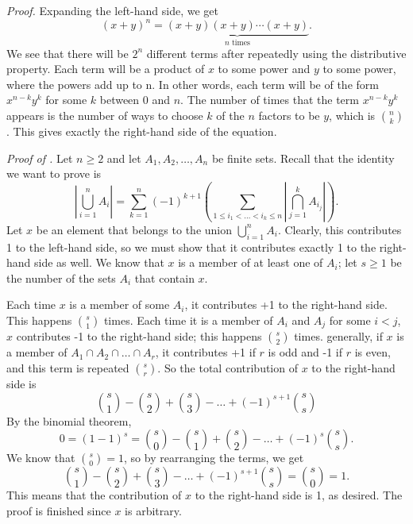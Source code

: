 \documentclass{tufte-handout}
\begin{document}
\textit{Proof.} Expanding the left-hand side, we get
\[(x+y)^n = \underbrace{(x+y)(x+y)\cdots(x+y)}_{n \text{ times}}.\]
We see that there will be \( 2^n \) different terms after repeatedly using the
distributive property. Each term will be a product of \( x \) to some power and
\( y \) to some power, where the powers add up to n. In other words, each term
will be of the form \( x^{n-k}y^k \) for some \( k \) between 0 and \( n \).
The number of times that the term \( x^{n-k}y^k \) appears is the number of ways
to choose \( k \) of the \( n \) factors to be \( y \), which is \( \binom{n}{k} \).
This gives exactly the right-hand side of the equation. \qedsymbol

\textit{Proof of .}
Let \( n \geq 2 \) and let \( A_1, A_2, \ldots , A_n \) be finite sets. Recall that
the identity we want to prove is 
\[\left|\bigcup_{i=1}^{n}A_i\right| = \sum_{k=1}^{n}(-1)^{k+1}\left(\sum_{1\leq i_1 < \ldots < i_k \leq n}\left|\bigcap_{j=1}^{k}A_{i_j}\right|\right).\]
Let \( x \) be an element that belongs to the union \( \bigcup_{i=1}^{n} A_i\). Clearly, this contributes
1 to the left-hand side, so we must show that it contributes exactly 1 to the right-hand side as well.
We know that \( x \) is a member of at least one of \( A_i \); let \( s\geq 1 \)
be the number of the sets \( A_i \) that contain \( x \).

Each time \( x \) is a member of some \( A_i \), it contributes +1 to the right-hand side.
This happens \( \binom{s}{1} \) times. Each time it is a member of \( A_i \) and \( A_j \) for some \( i < j \),
\( x \) contributes -1 to the right-hand side; this happens \( \binom{s}{2} \) times. generally,
if \( x \) is a member of \( A_1 \cap A_2 \cap \ldots \cap A_r \), it contributes +1 if \( r \) is odd
and -1 if \( r \) is even, and this term is repeated \( \binom{s}{r} \). 
So the total contribution of \( x \) to the right-hand side is
\[\binom{s}{1} - \binom{s}{2} + \binom{s}{3} - \ldots + (-1)^{s+1}\binom{s}{s}\]
By the binomial theorem, 
\[ 0 = (1-1)^s = \binom{s}{0} - \binom{s}{1} + \binom{s}{2} - \ldots + (-1)^s\binom{s}{s}.\]
We know that \( \binom{s}{0} = 1 \), so by rearranging the terms, we get
\[\binom{s}{1} - \binom{s}{2} + \binom{s}{3} - \ldots + (-1)^{s+1}\binom{s}{s} =\binom{s}{0} = 1.\]
This means that the contribution of \( x \) to the right-hand side is 1, as desired. 
The proof is finished since \( x \) is arbitrary.\qedsymbol
\end{document}
